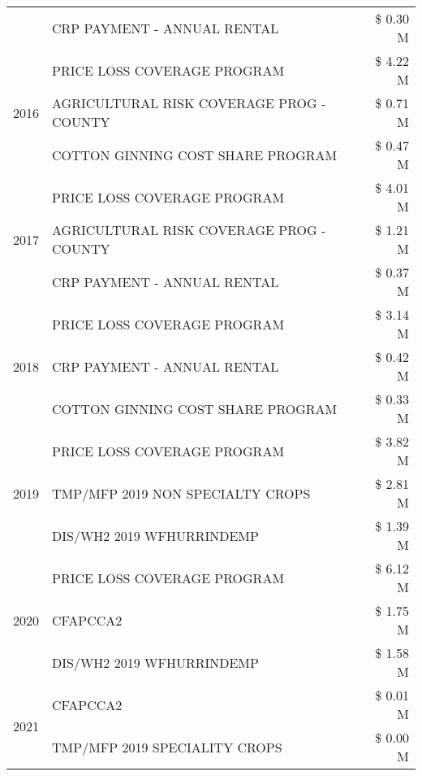 \begin{tabular}{llr}
 & CRP PAYMENT - ANNUAL RENTAL & \$ 0.30 M \\
\cline{1-3}
\multirow[t]{3}{*}{2016} & PRICE LOSS COVERAGE PROGRAM                   & \$ 4.22 M \\
 & AGRICULTURAL RISK COVERAGE PROG - COUNTY      & \$ 0.71 M \\
 & COTTON GINNING COST SHARE PROGRAM             & \$ 0.47 M \\
\cline{1-3}
\multirow[t]{3}{*}{2017} & PRICE LOSS COVERAGE PROGRAM & \$ 4.01 M \\
 & AGRICULTURAL RISK COVERAGE PROG - COUNTY & \$ 1.21 M \\
 & CRP PAYMENT - ANNUAL RENTAL & \$ 0.37 M \\
\cline{1-3}
\multirow[t]{3}{*}{2018} & PRICE LOSS COVERAGE PROGRAM & \$ 3.14 M \\
 & CRP PAYMENT - ANNUAL RENTAL & \$ 0.42 M \\
 & COTTON GINNING COST SHARE PROGRAM & \$ 0.33 M \\
\cline{1-3}
\multirow[t]{3}{*}{2019} & PRICE LOSS COVERAGE PROGRAM & \$ 3.82 M \\
 & TMP/MFP 2019 NON SPECIALTY CROPS & \$ 2.81 M \\
 & DIS/WH2 2019 WFHURRINDEMP & \$ 1.39 M \\
\cline{1-3}
\multirow[t]{3}{*}{2020} & PRICE LOSS COVERAGE PROGRAM & \$ 6.12 M \\
 & CFAPCCA2 & \$ 1.75 M \\
 & DIS/WH2 2019 WFHURRINDEMP & \$ 1.58 M \\
\cline{1-3}
\multirow[t]{2}{*}{2021} & CFAPCCA2 & \$ 0.01 M \\
 & TMP/MFP 2019 SPECIALITY CROPS & \$ 0.00 M \\
\cline{1-3}
\bottomrule
\end{tabular}
